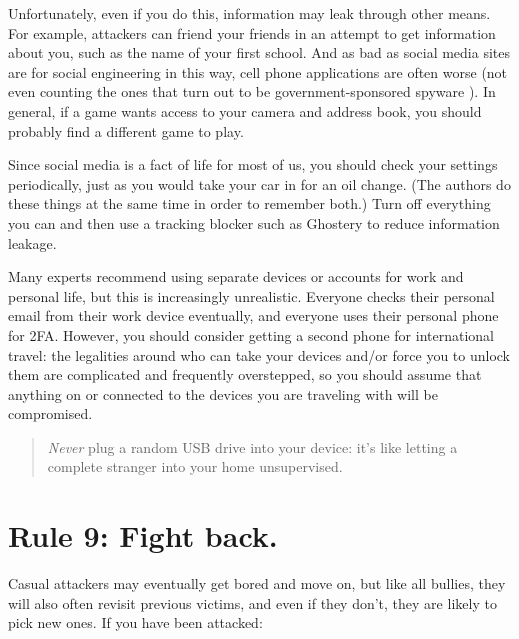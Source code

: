 \documentclass[10pt,letterpaper]{article}
\begin{document}
Unfortunately, even if you do this, information may leak through other
means. For example, attackers can friend your friends in an attempt to get
information about you, such as the name of your first school. And as bad as
social media sites are for social engineering in this way, cell phone
applications are often worse (not even counting the ones that turn out to be
government-sponsored spyware \cite{Schn2019}). In general, if a game wants
access to your camera and address book, you should probably find a different
game to play.

Since social media is a fact of life for most of us, you should check your
settings periodically, just as you would take your car in for an oil change.
(The authors do these things at the same time in order to remember both.)  Turn
off everything you can and then use a tracking blocker such as Ghostery to
reduce information leakage.

Many experts recommend using separate devices or accounts for work and personal
life, but this is increasingly unrealistic. Everyone checks their personal email
from their work device eventually, and everyone uses their personal phone for
2FA. However, you should consider getting a second phone for international
travel: the legalities around who can take your devices and/or force you to
unlock them are complicated and frequently overstepped, so you should assume
that anything on or connected to the devices you are traveling with will be
compromised.

\begin{quote}
  \emph{Never} plug a random USB drive into your device: it's like letting a
  complete stranger into your home unsupervised.
\end{quote}

\section*{Rule 9: Fight back.}

Casual attackers may eventually get bored and move on, but like all bullies,
they will also often revisit previous victims, and even if they don't, they are
likely to pick new ones. If you have been attacked:
\end{document}
